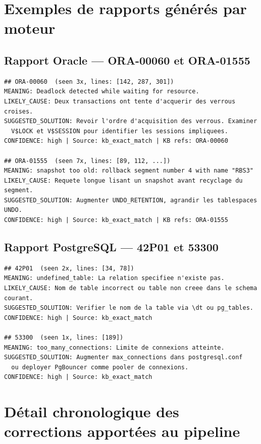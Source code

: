 \documentclass[12pt,a4paper]{report}
\begin{document}
\chapter{Exemples de rapports g\'en\'er\'es par moteur}

\section{Rapport Oracle --- ORA-00060 et ORA-01555}

\begin{lstlisting}[language={},caption={Extrait de rapport Oracle},label=lst:report_oracle]
## ORA-00060  (seen 3x, lines: [142, 287, 301])
MEANING: Deadlock detected while waiting for resource.
LIKELY_CAUSE: Deux transactions ont tente d'acquerir des verrous croises.
SUGGESTED_SOLUTION: Revoir l'ordre d'acquisition des verrous. Examiner
  V$LOCK et V$SESSION pour identifier les sessions impliquees.
CONFIDENCE: high | Source: kb_exact_match | KB refs: ORA-00060

## ORA-01555  (seen 7x, lines: [89, 112, ...])
MEANING: snapshot too old: rollback segment number 4 with name "RBS3"
LIKELY_CAUSE: Requete longue lisant un snapshot avant recyclage du segment.
SUGGESTED_SOLUTION: Augmenter UNDO_RETENTION, agrandir les tablespaces UNDO.
CONFIDENCE: high | Source: kb_exact_match | KB refs: ORA-01555
\end{lstlisting}

\section{Rapport PostgreSQL --- 42P01 et 53300}

\begin{lstlisting}[language={},caption={Extrait de rapport PostgreSQL},label=lst:report_pg]
## 42P01  (seen 2x, lines: [34, 78])
MEANING: undefined_table: La relation specifiee n'existe pas.
LIKELY_CAUSE: Nom de table incorrect ou table non creee dans le schema courant.
SUGGESTED_SOLUTION: Verifier le nom de la table via \dt ou pg_tables.
CONFIDENCE: high | Source: kb_exact_match

## 53300  (seen 1x, lines: [189])
MEANING: too_many_connections: Limite de connexions atteinte.
SUGGESTED_SOLUTION: Augmenter max_connections dans postgresql.conf
  ou deployer PgBouncer comme pooler de connexions.
CONFIDENCE: high | Source: kb_exact_match
\end{lstlisting}

\chapter{D\'etail chronologique des corrections apportées au pipeline}
\end{document}
